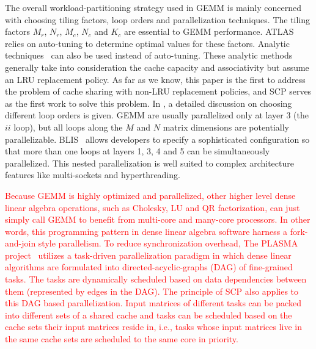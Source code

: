The overall workload-partitioning strategy used in
GEMM is mainly concerned with choosing 
tiling factors, loop orders and parallelization
techniques.
The tiling factors $M_r$, $N_r$, $M_c$, $N_c$ and $K_c$
are essential to GEMM performance.
ATLAS~\cite{atlas} relies on auto-tuning to determine optimal
values for these factors.
Analytic techniques~\cite{analytic1,analytic2,blisanalytic} 
can also be used instead of auto-tuning.
These analytic methods generally take into consideration
the cache capacity and associativity
but assume an LRU replacement policy.
As far as we know, this paper is the first to
address the problem of cache sharing with non-LRU replacement policies,
and SCP serves as the first work to solve this problem.
In \cite{gotogemm}, a detailed discussion on
choosing different loop orders is given.
GEMM are usually parallelized only at layer 3 (the $ii$ loop),
but all loops along the $M$ and $N$ matrix dimensions
are potentially parallelizable.
BLIS~\cite{blispar} allows developers to specify a sophisticated configuration
so that more than one loops at layers 1, 3, 4 and 5
can be simultaneously parallelized.
This nested parallelization is well suited to complex architecture features
like multi-sockets and hyperthreading. 

\textcolor{red}{
Because GEMM is highly optimized and parallelized,
other higher level dense linear algebra operations,
such as Cholesky, LU and QR factorization,
can just simply call GEMM to benefit from multi-core and many-core processors.
In other words, this programming pattern in dense linear algebra software
harness a fork-and-join style parallelism.
To reduce synchronization overhead,
The PLASMA project~\cite{plasma2009,plasma2010,plasma2017}
utilizes a task-driven parallelization paradigm
in which dense linear algorithms are formulated
into directed-acyclic-graphs (DAG) of fine-grained tasks.
The tasks are dynamically scheduled based on data dependencies
between them (represented by edges in the DAG).
The principle of SCP also applies to this DAG based parallelization.
Input matrices of different tasks can be packed into
different sets of a shared cache and
tasks can be scheduled based on the cache sets their input matrices reside in,
i.e., tasks whose input matrices live in the same cache sets
are scheduled to the same core in priority.
}
